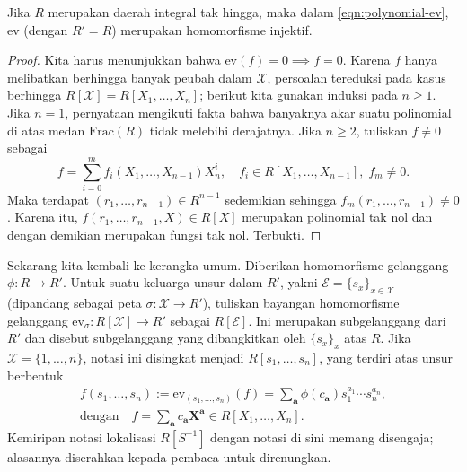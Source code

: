 \begin{proposition}\label{prop:polynomial-function}
	Jika $R$ merupakan daerah integral tak hingga, maka dalam \eqref{eqn:polynomial-ev}, $\mathrm{ev}$ (dengan $R'=R$) merupakan homomorfisme injektif.
\end{proposition}
\begin{proof}
	Kita harus menunjukkan bahwa $\text{ev}(f)=0 \implies f=0$. Karena $f$ hanya melibatkan berhingga banyak peubah dalam $\mathcal{X}$, persoalan tereduksi pada kasus berhingga $R[\mathcal{X}] = R[X_1, \ldots, X_n]$; berikut kita gunakan induksi pada $n \geq 1$. Jika $n=1$, pernyataan mengikuti fakta bahwa banyaknya akar suatu polinomial di atas medan $\text{Frac}(R)$ tidak melebihi derajatnya. Jika $n \geq 2$, tuliskan $f \neq 0$ sebagai
	\[ f = \sum_{i=0}^m f_i(X_1, \ldots, X_{n-1}) X_n^i, \quad f_i \in R[X_1, \ldots, X_{n-1}], \; f_m \neq 0. \]
	Maka terdapat $(r_1, \ldots, r_{n-1}) \in R^{n-1}$ sedemikian sehingga $f_m(r_1, \ldots, r_{n-1}) \neq 0$. Karena itu, $f(r_1, \ldots, r_{n-1}, X) \in R[X]$ merupakan polinomial tak nol dan dengan demikian merupakan fungsi tak nol. Terbukti.
\end{proof}

\begin{remark}
	Sekarang kita kembali ke kerangka umum. Diberikan homomorfisme gelanggang $\phi: R \to R'$. Untuk suatu keluarga unsur dalam $R'$, yakni $\mathcal{E} = \{s_x\}_{x \in \mathcal{X}}$ (dipandang sebagai peta $\sigma: \mathcal{X} \to R'$), tuliskan bayangan homomorfisme gelanggang $\text{ev}_\sigma: R[\mathcal{X}] \to R'$ sebagai $R[\mathcal{E}]$. Ini merupakan subgelanggang dari $R'$ dan disebut subgelanggang yang dibangkitkan oleh $\{s_x\}_x$ atas $R$. Jika $\mathcal{X}=\{1, \ldots, n\}$, notasi ini disingkat menjadi $R[s_1, \ldots, s_n]$, yang terdiri atas unsur berbentuk
	\begin{gather*}
		f(s_1, \ldots, s_n) := \text{ev}_{(s_1, \ldots, s_n)}(f) = \sum_{\bm{a}} \phi(c_{\bm{a}}) s_1^{a_1} \cdots s_n^{a_n}, \\
		\text{dengan} \quad f = \sum_{\bm{a}} c_{\bm{a}} \bm{X}^{\bm{a}} \in R[X_1, \ldots, X_n].
	\end{gather*}
	Kemiripan notasi lokalisasi $R[S^{-1}]$ dengan notasi di sini memang disengaja; alasannya diserahkan kepada pembaca untuk direnungkan.
\end{remark}
